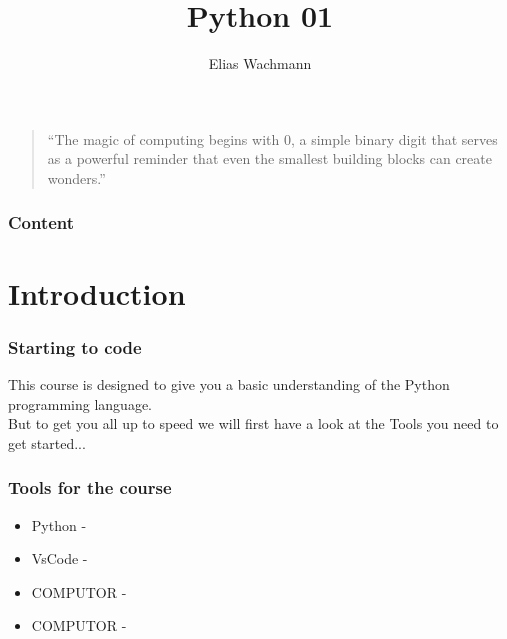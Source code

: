 \documentclass{beamer}
\title[]
{Python 01}
\author[E.~Wachmann]{\scriptsize Elias Wachmann
}
\date{\the\year}
\institute[Institute of Theoretical and Computational Physics]
{
}
\begin{document}
\titleframe


\begin{frame}
  \vspace*{\fill}
  \begin{center}
    \begin{quote}
        ``The magic of computing begins with 0, a simple binary digit that serves as a powerful reminder that even the smallest building blocks can create wonders.''
    \end{quote}
\end{center}
\vspace*{\fill}
\end{frame}

\begin{frame}
\frametitle{Content}
  \tableofcontents
\end{frame}

\section{Introduction}
\begin{frame}
  \frametitle{Starting to code}
  This course is designed to give you a basic understanding of the Python programming language.\\
  But to get you all up to speed we will first have a look at the Tools you need to get started...\\
\end{frame}

\begin{frame}
  \frametitle{Tools for the course}
  \begin{itemize}
    \item Python - 
    \item VsCode - 
    \item COMPUTOR - 
    \item COMPUTOR - 
  \end{itemize}
\end{frame}
\end{document}

